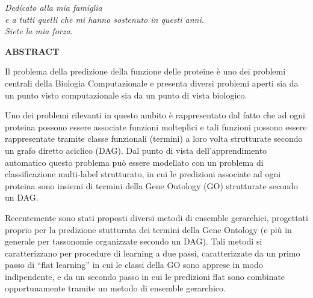 \documentclass[12pt]{report}
\begin{document}
%
%
%
%

% 
% 
\clearpage
\begin{center}
    \thispagestyle{empty}
    \vspace*{\fill}
    \emph{Dedicato alla mia famiglia 
    \\ e a tutti quelli che mi hanno sostenuto in questi anni.
    \\ Siete la mia forza.}
    \vspace*{\fill}
\end{center}
\clearpage

\Large
 \begin{center}
\textbf{ABSTRACT}
\end{center}

\hspace{10pt}



\normalsize

Il problema della predizione della funzione delle proteine \`e uno dei problemi centrali della Biologia Computazionale e presenta diversi problemi aperti sia da un punto visto computazionale sia da un punto di vista biologico.

Uno dei problemi rilevanti in questo ambito \`e rappresentato dal fatto che ad ogni proteina possono essere associate funzioni molteplici e tali funzioni possono essere rappresentate tramite classe funzionali (termini) a loro volta strutturate secondo un grafo diretto aciclico (DAG). Dal punto di vista dell'apprendimento automatico questo problema pu\`o essere modellato con un problema di classificazione multi-label strutturato, in cui le predizioni associate ad ogni proteina sono insiemi di termini della Gene Ontology (GO) strutturate secondo un DAG.

Recentemente sono stati proposti diversi metodi di ensemble gerarchici, progettati proprio per la predizione stutturata dei termini della Gene Ontology (e pi\`u in generale per tassonomie organizzate secondo un DAG). Tali metodi si caratterizzano per procedure di learning a due passi, caratterizzate da un primo passo di ``flat learning'' in cui le classi della GO sono apprese in modo indipendente, e da un secondo passo in cui le predizioni flat sono combinate opportunamente tramite un metodo di ensemble gerarchico.
\end{document}
